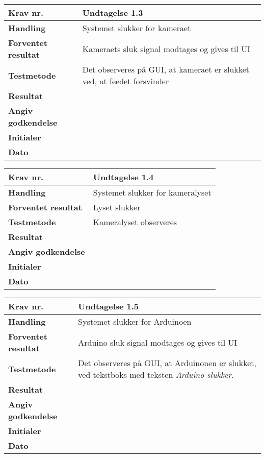 	\begin{center}
		\begin{longtable}{ | m{4cm}| m{8.5cm}|} 
			\hline
			\textbf{Krav nr.} & Undtagelse 1.3  \\ 
			\hline
			\textbf{Handling} & Systemet slukker for kameraet  \\
			\hline
			\textbf{Forventet resultat} & Kameraets sluk signal modtages og gives til UI \\
			\hline
			\textbf{Testmetode}  & Det observeres på GUI, at kameraet er slukket ved, at feedet forsvinder \\
			\hline
			\textbf{Resultat}  &    \\
			\hline
			\textbf{Angiv godkendelse} &     \\
			\hline
			\textbf{Initialer} &     \\
			\hline
			\textbf{Dato} &    \\
			\hline
		\end{longtable}
	\end{center}
			
	\begin{center}
		\begin{longtable}{ | m{4cm}| m{8.5cm}|} 
			\hline
			\textbf{Krav nr.} & Undtagelse 1.4  \\ 
			\hline
			\textbf{Handling} & Systemet slukker for kameralyset   \\
			\hline
			\textbf{Forventet resultat} & Lyset slukker \\
			\hline
			\textbf{Testmetode}  & Kameralyset observeres  \\
			\hline
			\textbf{Resultat}  &    \\
			\hline
			\textbf{Angiv godkendelse} &     \\
			\hline
			\textbf{Initialer} &     \\
			\hline
			\textbf{Dato} &    \\
			\hline
		\end{longtable}
	\end{center}		
			
\newpage			
			
	\begin{center}
		\begin{longtable}{ | m{4cm}| m{8.5cm}|} 
			\hline
			\textbf{Krav nr.} & Undtagelse 1.5  \\ 
			\hline
			\textbf{Handling} & Systemet slukker for Arduinoen   \\
			\hline
			\textbf{Forventet resultat} & Arduino sluk signal modtages og gives til UI \\
			\hline
			\textbf{Testmetode}  & Det observeres på GUI, at Arduinonen er slukket, ved tekstboks med teksten \textit{Arduino slukker}.  \\
			\hline
			\textbf{Resultat}  &    \\
			\hline
			\textbf{Angiv godkendelse} &     \\
			\hline
			\textbf{Initialer} &     \\
			\hline
			\textbf{Dato} &    \\
			\hline
		\end{longtable}
	\end{center}